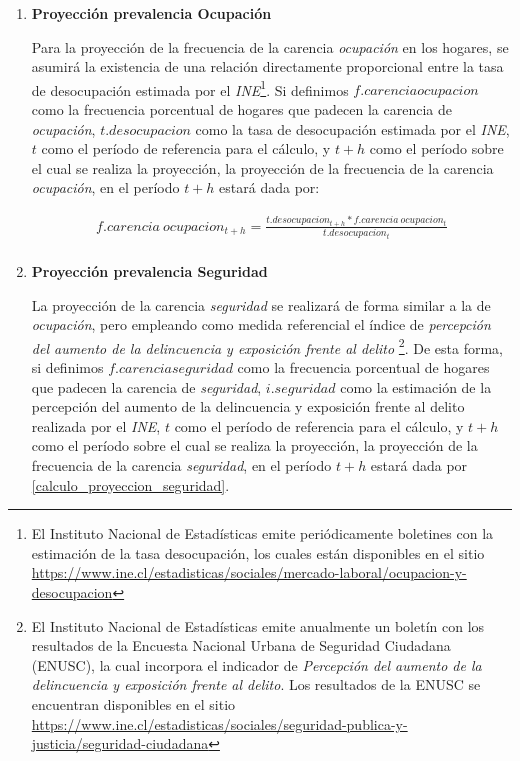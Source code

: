 \documentclass[12pt,letterpaper,spanish]{article}
\begin{document}
\begin{enumerate}

    \item \textbf{Proyección prevalencia Ocupación}
    
    Para la proyección de la frecuencia de la carencia \textit{ocupación} en los hogares, se asumirá la existencia de una relación directamente proporcional entre la tasa de desocupación estimada por el \textit{INE}\footnote{El Instituto Nacional de Estadísticas emite periódicamente boletines con la estimación de la tasa desocupación, los cuales están disponibles en el sitio \url{https://www.ine.cl/estadisticas/sociales/mercado-laboral/ocupacion-y-desocupacion}}. Si definimos $f.carencia ocupacion$ como la frecuencia porcentual de hogares que padecen la carencia de \textit{ocupación}, $t. desocupacion$ como la tasa de desocupación estimada por el \textit{INE}, $t$ como el período de referencia para el cálculo, y $t+h$ como el período sobre el cual se realiza la proyección, la proyección de la frecuencia de la carencia \textit{ocupación}, en el período $t+h$ estará dada por:
    
    \begin{equation}\label{calculo_proyeccion_ocupacion}
        \begin{split}
            f.carencia\:ocupacion_{t+h}=\frac{t.desocupacion_{t+h}*f.carencia\:ocupacion_t}{t.desocupacion_t}\\
        \end{split}
    \end{equation}
    
    \vspace{2em}
    
    
    
    
    \item \textbf{Proyección prevalencia Seguridad}
    
    La proyección de la carencia \textit{seguridad} se realizará de forma similar a la de \textit{ocupación}, pero empleando como medida referencial el índice de \textit{percepción del aumento de la delincuencia y exposición frente al delito} \footnote{El Instituto Nacional de Estadísticas emite anualmente un boletín con los resultados de la Encuesta Nacional Urbana de Seguridad Ciudadana (ENUSC), la cual incorpora el indicador de \textit{Percepción del aumento de la delincuencia y exposición frente al delito}. Los resultados de la ENUSC se encuentran disponibles en el sitio \url{https://www.ine.cl/estadisticas/sociales/seguridad-publica-y-justicia/seguridad-ciudadana}}. De esta forma, si definimos $f.carencia seguridad$ como la frecuencia porcentual de hogares que padecen la carencia de \textit{seguridad}, $i. seguridad$ como la estimación de la percepción del aumento de la delincuencia y exposición frente al delito realizada por el \textit{INE}, $t$ como el período de referencia para el cálculo, y $t+h$ como el período sobre el cual se realiza la proyección, la proyección de la frecuencia de la carencia \textit{seguridad}, en el período $t+h$ estará dada por \ref{calculo_proyeccion_seguridad}.
    

\end{enumerate}
\end{document}
